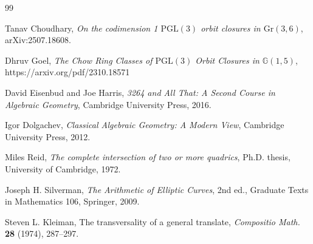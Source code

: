 \documentclass[11pt]{article}
\newcommand{\G}{\mathrm{Gr}}
\newcommand{\PGL}{\mathrm{PGL}}
\begin{document}
\begin{thebibliography}{99}

Tanav Choudhary,
\emph{On the codimension 1 $\PGL(3)$ orbit closures in $\G(3,6)$},
arXiv:2507.18608.

 Dhruv Goel, \emph{The Chow Ring Classes of $\PGL(3)$ Orbit Closures in $\mathbb{G}(1, 5)$}, https://arxiv.org/pdf/2310.18571

David Eisenbud and Joe Harris,
\emph{3264 and All That: A Second Course in Algebraic Geometry},
Cambridge University Press, 2016.

Igor Dolgachev,
\emph{Classical Algebraic Geometry: A Modern View},
Cambridge University Press, 2012.

Miles Reid,
\emph{The complete intersection of two or more quadrics},
Ph.D. thesis, University of Cambridge, 1972.

Joseph H. Silverman,
\emph{The Arithmetic of Elliptic Curves},
2nd ed., Graduate Texts in Mathematics 106, Springer, 2009.

Steven L. Kleiman,
The transversality of a general translate,
\emph{Compositio Math.} \textbf{28} (1974), 287--297.

\end{thebibliography}
\end{document}

